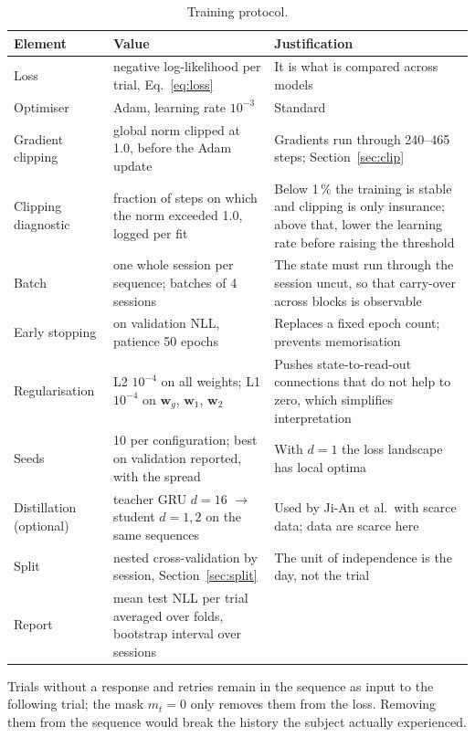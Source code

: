 \documentclass[11pt,a4paper]{article}
\newcommand{\vect}[1]{\bm{#1}}
\begin{document}
\begin{table}[H]
  \centering\small
  \caption{Training protocol.}
  \begin{tabular}{lp{5.5cm}p{7cm}}
    \toprule
    Element & Value & Justification \\
    \midrule
    Loss & negative log-likelihood per trial, Eq.~\eqref{eq:loss} & It is what is compared across models \\
    Optimiser & Adam, learning rate $10^{-3}$ & Standard \\
    Gradient clipping & global norm clipped at 1.0, before the Adam update & Gradients run through 240--465 steps; Section~\ref{sec:clip} \\
    Clipping diagnostic & fraction of steps on which the norm exceeded 1.0, logged per fit & Below 1\,\% the training is stable and clipping is only insurance; above that, lower the learning rate before raising the threshold \\
    Batch & one whole session per sequence; batches of 4 sessions & The state must run through the session uncut, so that carry-over across blocks is observable \\
    Early stopping & on validation NLL, patience 50 epochs & Replaces a fixed epoch count; prevents memorisation \\
    Regularisation & L2 $10^{-4}$ on all weights; L1 $10^{-4}$ on $\vect{w}_g$, $\vect{w}_1$, $\vect{w}_2$ & Pushes state-to-read-out connections that do not help to zero, which simplifies interpretation \\
    Seeds & 10 per configuration; best on validation reported, with the spread & With $d=1$ the loss landscape has local optima \\
    Distillation (optional) & teacher GRU $d=16$ $\rightarrow$ student $d=1,2$ on the same sequences & Used by Ji-An et al.\ with scarce data; data are scarce here \\
    Split & nested cross-validation by session, Section~\ref{sec:split} & The unit of independence is the day, not the trial \\
    Report & mean test NLL per trial averaged over folds, bootstrap interval over sessions & \\
    \bottomrule
  \end{tabular}
\end{table}

Trials without a response and retries remain in the sequence as input to the following
trial; the mask $m_t = 0$ only removes them from the loss. Removing them from the
sequence would break the history the subject actually experienced.
\end{document}
